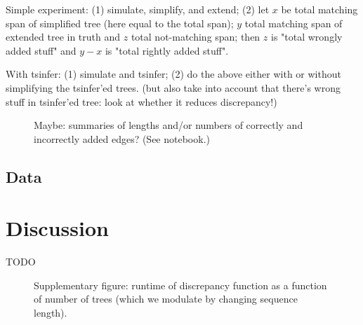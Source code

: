 \documentclass[10pt,twoside,lineno]{gsajnl}
\begin{document}
Simple experiment:
(1) simulate, simplify, and extend;
(2) let $x$ be total matching span of simplified tree (here equal to the total span); $y$ total matching span of extended tree in truth and $z$ total not-matching span;
then $z$ is "total wrongly added stuff" and $y-x$ is "total rightly added stuff".

With tsinfer: (1) simulate and tsinfer; (2) do the above either with or without simplifying the tsinfer'ed trees.
(but also take into account that there's wrong stuff in tsinfer'ed tree: look at whether it reduces discrepancy!)

\begin{figure}
    \caption{
        Maybe: summaries of lengths and/or numbers of correctly and incorrectly added edges?
        (See notebook.)
        \label{fig:results_edges}
    }
\end{figure}

\subsection{Data}



\section{Discussion}

TODO



\appendix

\begin{figure}
    \caption{
        Supplementary figure: runtime of discrepancy function as a function of number of trees
        (which we modulate by changing sequence length).
        \label{fig:speed_discrepancy}
    }
\end{figure}
\end{document}
